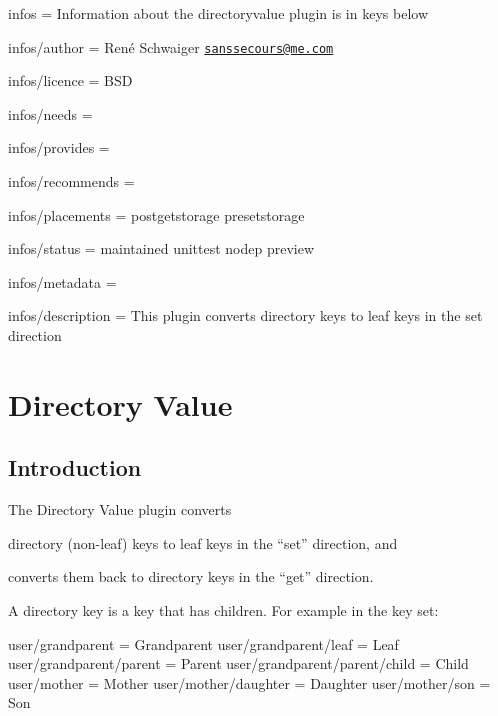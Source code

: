 
\begin{DoxyItemize}
\item infos = Information about the directoryvalue plugin is in keys below
\item infos/author = René Schwaiger \href{mailto:sanssecours@me.com}{\tt sanssecours@me.\+com}
\item infos/licence = B\+SD
\item infos/needs =
\item infos/provides =
\item infos/recommends =
\item infos/placements = postgetstorage presetstorage
\item infos/status = maintained unittest nodep preview
\item infos/metadata =
\item infos/description = This plugin converts directory keys to leaf keys in the set direction
\end{DoxyItemize}\hypertarget{md_src_plugins_directoryvalue_README_src_plugins_directoryvalue_README_md}{}\section{Directory Value}\label{md_src_plugins_directoryvalue_README_src_plugins_directoryvalue_README_md}
\subsection*{Introduction}

The Directory Value plugin converts


\begin{DoxyEnumerate}
\item directory (non-\/leaf) keys to leaf keys in the “set” direction, and
\item converts them back to directory keys in the “get” direction.
\end{DoxyEnumerate}

A directory key is a key that has children. For example in the key set\+:


\begin{DoxyCode}
user/grandparent                = Grandparent
user/grandparent/leaf           = Leaf
user/grandparent/parent         = Parent
user/grandparent/parent/child   = Child
user/mother                     = Mother
user/mother/daughter            = Daughter
user/mother/son                 = Son
\end{DoxyCode}


